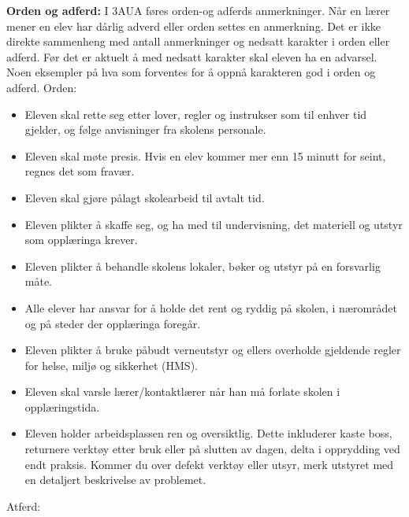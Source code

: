 \noindent
{\bf Orden og adferd:} I 3AUA føres orden-og adferds anmerkninger. Når en lærer mener en elev har dårlig adverd eller orden settes en anmerkning. Det er ikke direkte sammenheng med antall anmerkninger og nedsatt karakter i orden eller adferd. Før det er aktuelt å med nedsatt karakter skal eleven ha en advarsel. 
\vskip 10pt
Noen eksempler på hva som forventes for å oppnå karakteren god i orden og adferd. 
\vskip 10pt
Orden:
\begin{itemize}
\vskip 10pt
\item{}Eleven skal rette seg etter lover, regler og instrukser som til enhver tid gjelder, og følge anvisninger fra skolens personale.
\item{}Eleven skal møte presis. Hvis en elev kommer mer enn 15 minutt for seint, regnes det som fravær.
\item{}Eleven skal gjøre pålagt skolearbeid til avtalt tid.
\item{}Eleven plikter å skaffe seg, og ha med til undervisning, det materiell og utstyr som opplæringa krever.
\item{}Eleven plikter å behandle skolens lokaler, bøker og utstyr på en forsvarlig måte.
\item{}Alle elever har ansvar for å holde det rent og ryddig på skolen, i nærområdet og på steder der opplæringa foregår.
\item{}Eleven plikter å bruke påbudt verneutstyr og ellers overholde gjeldende regler for helse, miljø og sikkerhet (HMS).
\item{}Eleven skal varsle lærer/kontaktlærer når han må forlate skolen i opplæringstida.

\item{} Eleven holder arbeidsplassen ren og oversiktlig. Dette inkluderer kaste boss, returnere verktøy etter bruk eller på slutten av dagen, delta i opprydding ved endt praksis. Kommer du over defekt verktøy eller utsyr, merk utstyret med en detaljert beskrivelse av problemet. 
\vskip 10pt
\end{itemize}
Atferd:
\vskip 10pt
